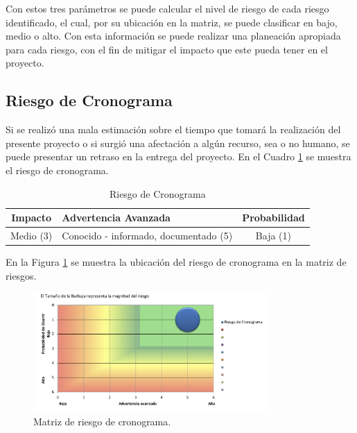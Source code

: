 Con estos tres parámetros se puede calcular el nivel de riesgo de cada riesgo
identificado, el cual, por su ubicación en la matriz, se puede clasificar en
bajo, medio o alto. Con esta información se puede realizar una planeación
apropiada para cada riesgo, con el fin de mitigar el impacto que este pueda
tener en el proyecto.

\subsection{Riesgo de Cronograma}

Si se realizó una mala estimación sobre el tiempo que tomará la realización del
presente proyecto o si surgió una afectación a algún recurso, sea o no humano,
se puede presentar un retraso en la entrega del proyecto. En el Cuadro
\ref{table:riesgo_cronograma} se muestra el riesgo de cronograma.

\begin{table}[H]
\centering
\begin{tabular}{|c|p{5cm}|c|}
\hline
\rowcolor{azulclaro}
  \centering\textbf{Impacto} & \centering\textbf{Advertencia Avanzada}\arraybackslash & \centering\textbf{Probabilidad}\arraybackslash \\
\hline
  Medio (3) & Conocido - informado, documentado (5) & Baja (1) \\
\hline
\end{tabular}
\caption{Riesgo de Cronograma}
\label{table:riesgo_cronograma}
\end{table}

En la Figura \ref{fig:riesgo_cronograma} se muestra la ubicación del riesgo de
cronograma en la matriz de riesgos.

\begin{figure}[H]
  \centering
  \includegraphics[width=0.8\textwidth]{imagenes/03-analisis/analisis-riesgos/riesgo-cronograma.png}
  \caption{Matriz de riesgo de cronograma.}
  \label{fig:riesgo_cronograma}
\end{figure}

